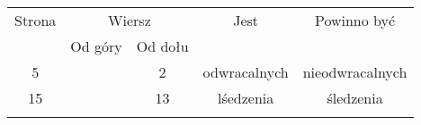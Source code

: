 \documentclass[a4paper,11pt]{article}
\begin{document}


\begin{center}

  \begin{tabular}{|c|c|c|c|c|}
    \hline
    Strona & \multicolumn{2}{c|}{Wiersz} & Jest
    & Powinno być \\ \cline{2-3}
    & Od góry & Od dołu &  &  \\ \hline
    5 & & 2 & odwracalnych & nieodwracalnych \\
    15 & & 13 & lśedzenia & śledzenia \\
    & & & & \\ \hline
  \end{tabular}

\end{center}

\vspace{\spaceTwo}

















{}






\end{document}
